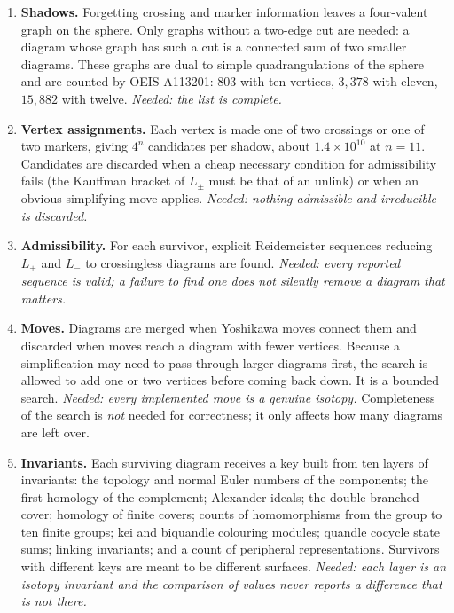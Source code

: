 \documentclass[11pt]{amsart}
\theoremstyle{plain}
\theoremstyle{remark}
\begin{document}
\begin{enumerate}[leftmargin=*]
\item \textbf{Shadows.} Forgetting crossing and marker information leaves a four-valent graph on the
sphere. Only graphs without a two-edge cut are needed: a diagram whose graph has such a cut is a
connected sum of two smaller diagrams. These graphs are dual to simple quadrangulations of the sphere and
are counted by OEIS A113201: $803$ with ten vertices, $3{,}378$ with eleven, $15{,}882$ with twelve.
\emph{Needed: the list is complete.}

\item \textbf{Vertex assignments.} Each vertex is made one of two crossings or one of two markers, giving
$4^n$ candidates per shadow, about $1.4\times 10^{10}$ at $n=11$. Candidates are discarded when a cheap
necessary condition for admissibility fails (the Kauffman bracket of $L_\pm$ must be that of an unlink) or
when an obvious simplifying move applies. \emph{Needed: nothing admissible and irreducible is discarded.}

\item \textbf{Admissibility.} For each survivor, explicit Reidemeister sequences reducing $L_+$ and $L_-$
to crossingless diagrams are found. \emph{Needed: every reported sequence is valid; a failure to find one
does not silently remove a diagram that matters.}

\item \textbf{Moves.} Diagrams are merged when Yoshikawa moves connect them and discarded when moves reach
a diagram with fewer vertices. Because a simplification may need to pass through larger diagrams first,
the search is allowed to add one or two vertices before coming back down. It is a bounded search.
\emph{Needed: every implemented move is a genuine isotopy.} Completeness of the search is \emph{not}
needed for correctness; it only affects how many diagrams are left over.

\item \textbf{Invariants.} Each surviving diagram receives a key built from ten layers of invariants: the
topology and normal Euler numbers of the components; the first homology of the complement; Alexander
ideals; the double branched cover; homology of finite covers; counts of homomorphisms from the group to
ten finite groups; kei and biquandle colouring modules; quandle cocycle state sums; linking invariants;
and a count of peripheral representations. Survivors with different keys are meant to be different
surfaces. \emph{Needed: each layer is an isotopy invariant and the comparison of values never reports a
difference that is not there.}
\end{enumerate}
\end{document}
